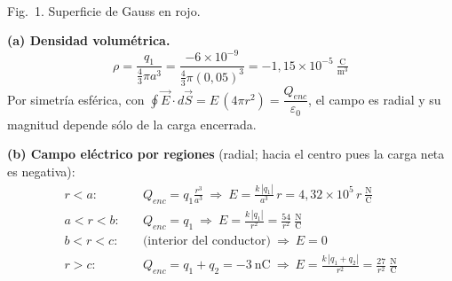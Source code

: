 \documentclass[12pt,letterpaper]{article}
\newcommand{\secgap}{\vspace{0.5cm}}
\begin{document}
\medskip
\noindent
\begin{minipage}[c]{0.32\textwidth}
\centering
{}\\[2pt]
{\scriptsize Fig.\ 1. Superficie de Gauss en rojo.}
\end{minipage}%
\hfill
\begin{minipage}[c]{0.63\textwidth}
\textbf{(a) Densidad volum\'etrica.}
\[
    \rho=\frac{q_1}{\tfrac{4}{3}\pi a^{3}}=\frac{-6\times10^{-9}}{\tfrac{4}{3}\pi(0{,}05)^{3}}
    =\boxed{-1{,}15\times10^{-5}\ \tfrac{\text{C}}{\text{m}^3}}
\]
Por simetr\'ia esf\'erica, con $\oint\vec E\cdot d\vec S=E\,(4\pi r^{2})=\dfrac{Q_{enc}}{\varepsilon_0}$,
el campo es radial y su magnitud depende s\'olo de la carga encerrada.
\end{minipage}

\secgap

\noindent\textbf{(b) Campo el\'ectrico por regiones} (radial; hacia el centro pues la carga neta es negativa):
\begin{align*}
    r<a:&\quad Q_{enc}=q_1\frac{r^{3}}{a^{3}}
    \ \Rightarrow\ \boxed{E=\frac{k\,|q_1|}{a^{3}}\,r=4{,}32\times10^{5}\,r\ \tfrac{\text{N}}{\text{C}}}\\[2pt]
    a<r<b:&\quad Q_{enc}=q_1
    \ \Rightarrow\ \boxed{E=\frac{k\,|q_1|}{r^{2}}=\frac{54}{r^{2}}\ \tfrac{\text{N}}{\text{C}}}\\[2pt]
    b<r<c:&\quad \text{(interior del conductor)}\ \Rightarrow\ \boxed{E=0}\\[2pt]
    r>c:&\quad Q_{enc}=q_1+q_2=-3\ \text{nC}
    \ \Rightarrow\ \boxed{E=\frac{k\,|q_1+q_2|}{r^{2}}=\frac{27}{r^{2}}\ \tfrac{\text{N}}{\text{C}}}
\end{align*}
\end{document}
